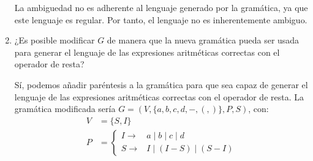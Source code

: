 \begin{ejercicio}
\begin{enumerate}
        La ambiguedad no es adherente al lenguaje generado por la gramática, ya que este lenguaje es regular. Por tanto, el lenguaje no es inherentemente ambiguo.
        \begin{comment}
        Una gramática que no sea ambigua y que genere el mismo lenguaje es $G=(V,\{a,b,c,d,-\},P,S)$, con:
        \begin{equation*}
            \begin{aligned}
                V &= \{ S, I \} \\
                P &= \left\{
                    \begin{aligned}
                        I\rightarrow &a \mid b \mid c \mid d \\
                        S\rightarrow &I \mid I-S
                    \end{aligned}
                \right.
            \end{aligned}
        \end{equation*}
        \end{comment}
        \item ¿Es posible modificar $G$ de manera que la nueva gramática pueda ser usada para generar el lenguaje de las expresiones aritméticas correctas con el operador de resta?
        
        Sí, podemos añadir paréntesis a la gramática para que sea capaz de generar el lenguaje de las expresiones aritméticas correctas con el operador de resta. La gramática modificada sería $G=(V,\{a,b,c,d,-,(,)\},P,S)$, con:
        \begin{equation*}
            \begin{aligned}
                V &= \{ S, I \} \\
                P &= \left\{
                    \begin{aligned}
                        I\rightarrow &a \mid b \mid c \mid d \\
                        S\rightarrow &I \mid (I-S) \mid (S-I)
                    \end{aligned}
                \right.
            \end{aligned}
        \end{equation*}
    \end{enumerate}
\end{ejercicio}

